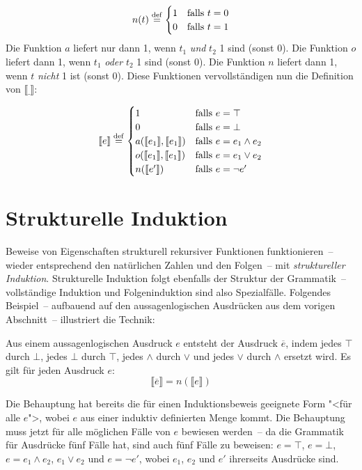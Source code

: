 \begin{displaymath}
  n(t) \stackrel{\rm def}{=} 
  \begin{cases}
    1 & \textrm{falls } t = 0\\
    0 & \textrm{falls } t = 1
  \end{cases}
\end{displaymath}
%
Die Funktion $a$ liefert nur dann 1, wenn $t_1$ \emph{und} $t_2$ 1
sind (sonst $0$).  Die Funktion $o$ liefert dann 1, wenn $t_1$
\emph{oder} $t_2$ 1 sind (sonst $0$).  Die Funktion $n$ liefert dann
1, wenn $t$ \emph{nicht} 1 ist (sonst $0$).  Diese Funktionen
vervollständigen nun die Definition von $\llbracket \underline{~}
\rrbracket$:

\begin{displaymath}
  \llbracket e \rrbracket \stackrel{\rm def}{=}
  \begin{cases}
    1 & \textrm{falls } e = \top\\
    0 & \textrm{falls } e = \bot\\
    a(\llbracket e_1 \rrbracket, \llbracket e_1 \rrbracket) & 
    \textrm{falls } e =
    e_1\wedge e_2\\
    o(\llbracket e_1 \rrbracket, \llbracket e_1 \rrbracket) & 
    \textrm{falls } e =
    e_1\vee e_2\\
    n(\llbracket e' \rrbracket) & \textrm{falls } e = \neg e'
  \end{cases}
\end{displaymath}

\section{Strukturelle Induktion}
\label{sec:structural-induction}

Beweise von Eigenschaften strukturell rekursiver Funktionen
funktionieren~-- wieder entsprechend den natürlichen Zahlen und den
Folgen~-- mit \textit{struktureller Induktion}. Strukturelle Induktion folgt
ebenfalls der Struktur der Grammatik~-- vollständige Induktion und
Folgeninduktion sind also Spezialfälle.  Folgendes Beispiel~-- aufbauend
auf den aussagenlogischen Ausdrücken aus dem vorigen Abschnitt~--
illustriert die Technik:

\begin{satz}
  Aus einem aussagenlogischen Ausdruck $e$ entsteht der Ausdruck
  $\overline{e}$\label{page:overline}, indem jedes $\top$ durch $\bot$, jedes $\bot$ durch
  $\top$, jedes $\wedge$ durch $\vee$ und jedes $\vee$ durch $\wedge$
  ersetzt wird.  Es gilt für jeden Ausdruck $e$:
  \begin{displaymath}
    \llbracket \overline{e}\rrbracket = n(\llbracket e\rrbracket)
  \end{displaymath}
\end{satz}
%
Die Behauptung hat bereits die für einen Induktionsbeweis geeignete
Form "<für alle $e$">, wobei $e$ aus einer induktiv definierten Menge
kommt.  Die Behauptung muss jetzt für alle möglichen Fälle von $e$
bewiesen werden~-- da die Grammatik für Ausdrücke fünf Fälle hat, sind
auch fünf Fälle zu beweisen: $e=\top$, $e=\bot$, $e=e_1\wedge e_2$,
$e_1\vee e_2$ und $e=\neg e'$, wobei $e_1$, $e_2$ und $e'$
ihrerseits Ausdrücke sind.

